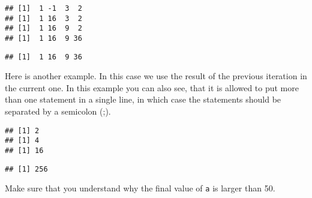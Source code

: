 \documentclass[paper=a4,headsepline,BCOR=12mm,twoside,open=right,%
titlepage,headings=small,fontsize=10pt,index=totoc,bibliography=totoc,%
captions=tableheading,captions=nooneline]{scrbook}\usepackage{knitr}
\begin{document}
\begin{knitrout}\footnotesize
{}\color{fgcolor}\begin{kframe}
\begin{alltt}
 \hlkwb{<-} \hlstd{(}\hlstd{,} \hlstd{,} \hlstd{,} \hlstd{,} \hlstd{)}
 \hlkwb{<-} 
  \hlopt{<} 
   \hlkwb{<-} \hlopt{^}
   \hlkwb{<-}  \hlopt{+} 
\hlstd{\}}
\end{alltt}
\begin{verbatim}
## [1]  1 -1  3  2
## [1]  1 16  3  2
## [1]  1 16  9  2
## [1]  1 16  9 36
\end{verbatim}
\begin{alltt}
\end{alltt}
\begin{verbatim}
## [1]  1 16  9 36
\end{verbatim}
\end{kframe}
\end{knitrout}

Here is another example. In this case we use the result of the previous iteration in the current one. In this example you can also see, that it is allowed to put more than one statement in a single line, in which case the statements should be separated by a semicolon (;).

\begin{knitrout}\footnotesize
{}\color{fgcolor}\begin{kframe}
\begin{alltt}
 \hlkwb{<-} 
  \hlopt{<} \hlstd{) \{} \hlkwb{<-} \hlopt{^}\hlstd{\}}
\end{alltt}
\begin{verbatim}
## [1] 2
## [1] 4
## [1] 16
\end{verbatim}
\begin{alltt}
\end{alltt}
\begin{verbatim}
## [1] 256
\end{verbatim}
\end{kframe}
\end{knitrout}

Make sure that you understand why the final value of \texttt{a} is larger than 50.
\end{document}
